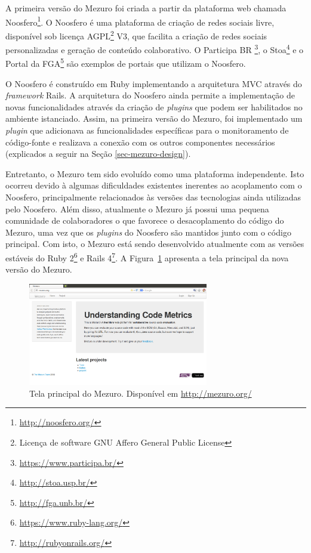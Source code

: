 %

A primeira versão do Mezuro foi criada a partir da plataforma web chamada Noosfero\footnote{\url{http://noosfero.org/}}. O Noosfero é uma plataforma de criação de redes sociais livre, disponível sob licença AGPL\footnote{Licença de software GNU Affero General Public License} V3, que facilita a criação de redes sociais personalizadas e geração de conteúdo colaborativo. O Participa BR \footnote{\url{https://www.participa.br/}}, o Stoa\footnote{\url{http://stoa.usp.br/}} e o Portal da FGA\footnote{\url{http://fga.unb.br/}} são exemplos de portais que utilizam o Noosfero. 

%

O Noosfero é construído em Ruby implementando a arquitetura MVC através do \emph{framework} Rails. A arquitetura do Noosfero ainda permite a implementação de novas funcionalidades através da criação de \emph{plugins} que podem ser habilitados no ambiente istanciado. Assim, na primeira versão do Mezuro, foi implementado um \emph{plugin} que adicionava as funcionalidades específicas para o monitoramento de código-fonte e realizava a conexão com os outros componentes necessários (explicados a seguir na Seção \ref{sec-mezuro-design}).

%

Entretanto, o Mezuro tem sido evoluído como uma plataforma independente. Isto ocorreu devido à algumas dificuldades existentes inerentes ao acoplamento com o Noosfero, principalmente relacionados às versões das tecnologias ainda utilizadas pelo Noosfero. Além disso, atualmente o Mezuro já possui uma pequena comunidade de colaboradores o que favorece o desacoplamento do código do Mezuro, uma vez que os \emph{plugins} do Noosfero são mantidos junto com o código principal. Com isto, o Mezuro está sendo desenvolvido atualmente com as versões estáveis do Ruby 2\footnote{\url{https://www.ruby-lang.org/}} e Rails 4\footnote{\url{http://rubyonrails.org/}}. A Figura~\ref{mezuro} apresenta a tela principal da nova versão do Mezuro.

%

\graphicspath{{figuras/}}
\begin{figure}[h]
\centering
\includegraphics[width=0.7\textwidth]{mezuro-standalone}
\caption{Tela principal do Mezuro. Disponível em \url{http://mezuro.org/}}
\label{mezuro}
\end{figure}

